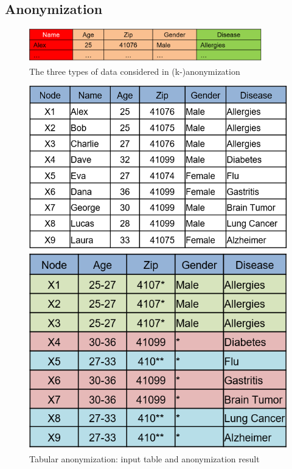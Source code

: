 	\subsection{Anonymization}
	\label{ssect:app_snonymization}
	
	\begin{figure}[ht]
		\label{fig_graph_based_img_classification}
		\begin{center}
			\includegraphics[width=0.9\textwidth]{figures/anonym/3typesofdata}
			\caption{The three types of data considered in (k-)anonymization}
		\end{center}
	\end{figure}
	
	
	\begin{figure}[H]
		\centering
		\begin{minipage}[b]{0.5\textwidth}
			\includegraphics[width=\textwidth]{figures/anonym/k_anon_input}
		\end{minipage}
		\hfill
		\begin{minipage}[b]{0.418\textwidth}
			\includegraphics[width=\textwidth]{figures/anonym/k_anon_output}
		\end{minipage}
		\caption{Tabular anonymization: input table and anonymization result}
	\end{figure}	
	
